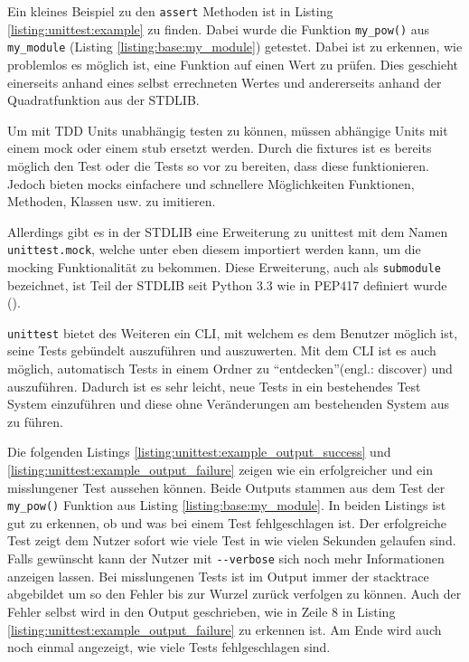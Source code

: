 Ein kleines Beispiel zu den \lstinline{assert} Methoden ist in Listing
\ref{listing:unittest:example} zu finden. Dabei wurde die Funktion
\lstinline{my_pow()} aus \lstinline{my_module} (Listing
\ref{listing:base:my_module}) getestet. Dabei ist zu erkennen, wie problemlos
es möglich ist, eine Funktion auf einen Wert zu prüfen. Dies geschieht
einerseits anhand eines selbst errechneten Wertes und andererseits anhand der
Quadratfunktion aus der STDLIB.

Um mit TDD Units unabhängig testen zu können, müssen abhängige Units mit einem
\Gls{mock} oder einem \Gls{stub} ersetzt werden. Durch die \Glspl{fixture} ist
es bereits möglich den Test oder die Tests so vor zu
bereiten, dass diese funktionieren. Jedoch bieten \Glspl{mock} einfachere und
schnellere Möglichkeiten Funktionen, Methoden, Klassen usw. zu imitieren.

Allerdings gibt es in der STDLIB eine Erweiterung zu unittest mit dem Namen
\lstinline{unittest.mock}, welche unter eben diesem importiert werden kann, um
die \gls{mock}ing Funktionalität zu bekommen. Diese Erweiterung, auch als
\lstinline{submodule} bezeichnet, ist Teil der STDLIB seit Python 3.3 wie in
PEP417 definiert wurde (\cite{python.org:PEP417}).

\lstinline{unittest} bietet des Weiteren ein CLI, mit welchem es dem Benutzer
möglich ist, seine Tests gebündelt auszuführen und auszuwerten. Mit dem CLI
ist es auch möglich, automatisch Tests in einem Ordner zu 
"`entdecken"'(engl.: discover) und auszuführen. Dadurch ist es sehr leicht,
neue Tests in ein bestehendes Test System einzuführen und diese ohne
Veränderungen am bestehenden System aus zu führen.

Die folgenden Listings \ref{listing:unittest:example_output_success} und
\ref{listing:unittest:example_output_failure} zeigen wie ein erfolgreicher und 
ein misslungener Test aussehen können. Beide Outputs stammen aus dem Test
der \lstinline{my_pow()} Funktion aus Listing \ref{listing:base:my_module}.
In beiden Listings ist gut zu erkennen, ob und was bei einem Test 
fehlgeschlagen ist. Der erfolgreiche Test zeigt dem Nutzer sofort wie viele 
Test in wie vielen Sekunden gelaufen sind. Falls gewünscht kann der Nutzer mit  
\lstinline|--verbose| sich noch mehr Informationen anzeigen lassen.
Bei misslungenen Tests ist im Output immer der \gls{stacktrace} abgebildet um 
so den Fehler bis zur Wurzel zurück verfolgen zu können. Auch der Fehler selbst 
wird in den Output geschrieben, wie in Zeile 8 in Listing 
\ref{listing:unittest:example_output_failure} zu erkennen ist. Am Ende wird 
auch noch einmal angezeigt, wie viele Tests fehlgeschlagen sind.

